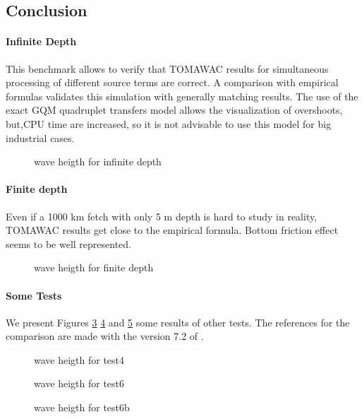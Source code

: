 \subsection{Conclusion}
\paragraph{Infinite Depth}
This benchmark allows to verify that TOMAWAC results for simultaneous processing of different source terms are correct. A comparison with empirical formulas validates this simulation with generally matching results. The use of the exact GQM quadruplet transfers model allows the visualization of overshoots, but,CPU time are increased, so it is not advisable to use this model for big industrial cases.
\begin{figure}[h!]
  \centering
  \caption{wave heigth for infinite depth}
\label{resultinfinite}
\end{figure}

\paragraph*{Finite depth}
Even if a 1000 km fetch with only 5 m depth is hard to study in reality, TOMAWAC results get close to the empirical formula. Bottom friction effect seems to be well represented.
\begin{figure}[h!]
  \centering
  \caption{wave heigth for finite depth}
\label{finite}
\end{figure}


\paragraph*{Some Tests}
We present Figures \ref{test4} \ref{test6} and \ref{test6b} some results of other tests. The references for the comparison are made with the version 7.2 of \tomawac.   
\begin{figure}[h!]
  \centering
  \caption{wave heigth for test4}
\label{test4}
\end{figure}
\begin{figure}[h!]
  \centering
  \caption{wave heigth for test6}
\label{test6}
\end{figure}
\begin{figure}[h!]
  \centering
  \caption{wave heigth for test6b}
\label{test6b}
\end{figure}
